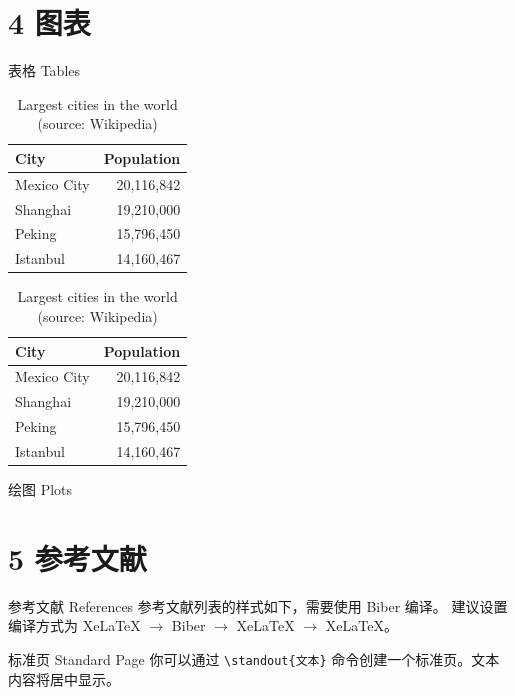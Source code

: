 \documentclass[10pt,aspectratio=169,fontset=none]{ctexbeamer}
\begin{document}
    \section{4 图表}

    \begin{frame}{表格 Tables}
        \begin{table}
            \caption{Largest cities in the world (source: Wikipedia)}
            \label{tab:table1}
            \begin{tabular}{@{} lr @{}}
            \toprule
            City & Population\\
            \midrule
            Mexico City & 20,116,842\\
            Shanghai & 19,210,000\\
            Peking & 15,796,450\\
            Istanbul & 14,160,467\\
            \bottomrule
            \end{tabular}
            \hspace*{1cm}
              \setlength\extrarowheight{3pt}
            \begin{tabular}{|lr|}
            \hline
            \rowcolor{primary}\color{background}City & \color{background}Population\\
            \hline
            Mexico City & 20,116,842\\
            Shanghai & 19,210,000\\
            Peking & 15,796,450\\
            Istanbul & 14,160,467\\
            \hline
            \end{tabular}
        \end{table}
    \end{frame}

    \begin{frame}{绘图 Plots}
       
    
    \end{frame}

    \section{5 参考文献}

    \begin{frame}{参考文献 References}
        参考文献列表的样式如下，需要使用 Biber 编译。 建议设置编译方式为 XeLaTeX $\to$ Biber $\to$ XeLaTeX $\to$ XeLaTeX。
        \vspace*{1em}
         
        
    \end{frame}

    \begin{frame}{标准页 Standard Page}
        你可以通过 \texttt{\textcolor{primary}{\textbackslash standout}\{文本\}} 命令创建一个标准页。文本内容将居中显示。
    \end{frame}

\end{document}
